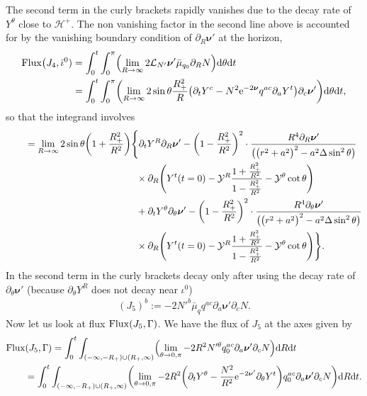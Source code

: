 \documentclass[pdftex]{sigma}
\def\ptl{\partial}%
\def\mbo#1{\boldsymbol{#1}}%
\numberwithin{equation}{section}
\begin{document}
The second term in the curly brackets rapidly vanishes due to the decay rate of $Y^ \theta$ close to $\mathcal{H}^+$. The non vanishing factor in the second line above is accounted for by the vanishing boundary condition of $\ptl_R \mbo{\nu}'$ at the horizon,
\begin{align*}
{\rm Flux} \bigl(J_4, \bar{\iota}^0) &{}= \int^t_0 \int^\pi _0 \Bigl(\lim_{R \to \infty} 2 \mathcal{L}_{N'} \mbo{\nu}' \bar{\mu}_{q_0} \ptl_R N \Bigr) {\rm d}\theta {\rm d}t \notag \\
&{}= \int^t_0 \int^\pi _0 \biggl( \lim_{R \to \infty} 2 \sin \theta \frac{R^2_+}{R} \bigl(\ptl_t Y^c - N^2 {\rm e}^{-2 \mbo{\nu}} q^{ac} \ptl_a Y^t\bigr) \ptl_c \mbo{\nu}' \biggr) {\rm d} \theta {\rm d}t,
\end{align*}
so that the integrand involves
\begin{align*}
\qquad{} &{}= \lim_{R \to \infty} 2 \sin \theta \biggl(1+ \frac{R^2_+}{R^2} \biggr) \Biggl\{ \ptl_t Y^R \ptl_R \mbo{\nu}' - \biggl(1- \frac{R^2_+}{R^2} \biggr)^2 \cdot \frac{R^4 \ptl_R \mbo{\nu}'}{ \bigl(\bigl(r^2+a^2\bigr)^2 -a^2 \Delta
 	\sin^2 \theta \bigr)} \notag\\
 & \hphantom{= \lim_{R \to \infty} 2 \sin \theta \biggl(1+ \frac{R^2_+}{R^2} \biggr) \Biggl\{}{}
 \times \ptl_R \Biggl(Y^t (t=0) - \mathcal{Y}^R \frac{1 + \frac{R^2_+}{R^2}} {{1-\frac{R^2_+}{R^2}} } - \mathcal{Y}^ \theta \cot \theta \Biggr) \notag\\
 & \hphantom{= \lim_{R \to \infty} 2 \sin \theta \biggl(1+ \frac{R^2_+}{R^2} \biggr) \Biggl\{}{}
 + \ptl_t Y^ \theta \ptl_\theta \mbo{\nu}' - \biggl(1 - \frac{R^2_+}{R^2} \biggr)^2 \cdot \frac{R^4 \ptl_\theta \mbo{\nu}'}{ \bigl(\bigl(r^2+a^2\bigr)^2 -a^2 \Delta \sin^2 \theta\bigr)} \notag\\
 & \hphantom{= \lim_{R \to \infty} 2 \sin \theta \biggl(1+ \frac{R^2_+}{R^2} \biggr) \Biggl\{}{}
 \times \ptl_R \Biggl(Y^t(t=0) - \mathcal{Y}^R \frac{1+ \frac{R^2_+}{R^2}}{1-\frac{R^2_+}{R^2}} - \mathcal{Y}^\theta \cot \theta \Biggr) \Biggr\}.
\end{align*}
In the second term in the curly brackets decay only after using the decay rate of $\ptl_ \theta \mbo{\nu}'$ \big(because $ \ptl_\theta Y^R$ does not decay near $\iota^0$\big)
\begin{align*}
(J_5)^b := -2N'^b \bar{\mu}_q q^{ac} \ptl_a \mbo{\nu}' \ptl_c N.
\end{align*}
Now let us look at flux
${\rm Flux} (J_5, \Gamma)$.
We have the flux of $J_5$ at the axes given by
\begin{align*}
&{\rm Flux} (J_5, \Gamma)= \int^t_0 \int_{(-\infty, -R_+) \cup (R_+, \infty)} \Bigl(\lim_{\theta \to 0, \pi}-2 R^2 N'^ \theta q^{ac}_0 \ptl_a \mbo{\nu}' \ptl_c N\Bigr) {\rm d}R {\rm d}t \\
&\qquad{}= \int^t_0 \int_{(-\infty, -R_+) \cup (R_+, \infty)} \biggl(\lim_{\theta \to 0, \pi} -2 R^2 \biggl(\ptl_ t Y^\theta - \frac{N^2}{R^2} {\rm e}^{-2 \mbo{\nu}'} \ptl_\theta Y^t \biggr) q^{ac}_0 \ptl_a \mbo{\nu}' \ptl_c N\biggr) {\rm d}R {\rm d}t.
\end{align*}
\end{document}
